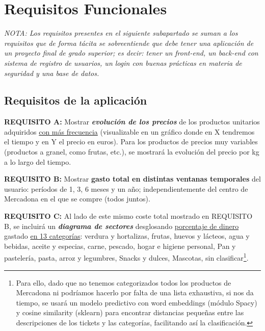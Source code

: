 \documentclass[a4paper,12pt]{report}
\begin{document}
		
		
		
		\section{Requisitos Funcionales}
		
			\textit{NOTA: Los requisitos presentes en el siguiente subapartado se suman a los requisitos que de forma tácita se sobreentiende que debe tener una aplicación de un proyecto final de grado superior; es decir: tener un front-end, un back-end con sistema de registro de usuarios, un login con buenas prácticas en materia de seguridad y una base de datos.}
		
		
			\subsection{Requisitos de la aplicación}
			\label{sec:requisitosAplicacion}
			
		

			

			
		
			
			\textbf{REQUISITO A:} Mostrar\textbf{ \textit{evolución de los precios}} de los productos unitarios adquiridos \underline{con más frecuencia} (visualizable en un gráfico donde en X tendremos el tiempo y en Y el precio en euros). Para los productos de precios muy variables (productos a granel, como frutas, etc.), se mostrará la evolución del precio por kg a lo largo del tiempo.
			
			\textbf{REQUISITO B:} Mostrar {\textbf{gasto total en distintas ventanas temporales}} del usuario: períodos de 1, 3, 6 meses y un año; independientemente del centro de Mercadona en el que se compre (todos juntos).
			
			\textbf{REQUISITO C:} Al lado de este mismo coste total mostrado en REQUISITO B, se incluirá un \textbf{\textit{diagrama de sectores}} desglosando \underline{porcentaje de dinero} gastado \underline{en 13 categorías}: verdura y hortalizas, frutas, huevos y lácteos, agua y bebidas, aceite y especias, carne, pescado, hogar e higiene personal, Pan y pastelería, pasta, arroz y legumbres, Snacks y dulces, Mascotas, sin clasificar\footnote{Para ello, dado que no tenemos categorizados todos los productos de Mercadona ni podríamos hacerlo por falta de una lista exhaustiva, si nos da tiempo, se usará un modelo predictivo con word embeddings (módulo Spacy) y cosine similarity (sklearn) para encontrar distancias pequeñas entre las descripciones de los tickets y las categorías, facilitando así la clasificación.}.
			
\end{document}
